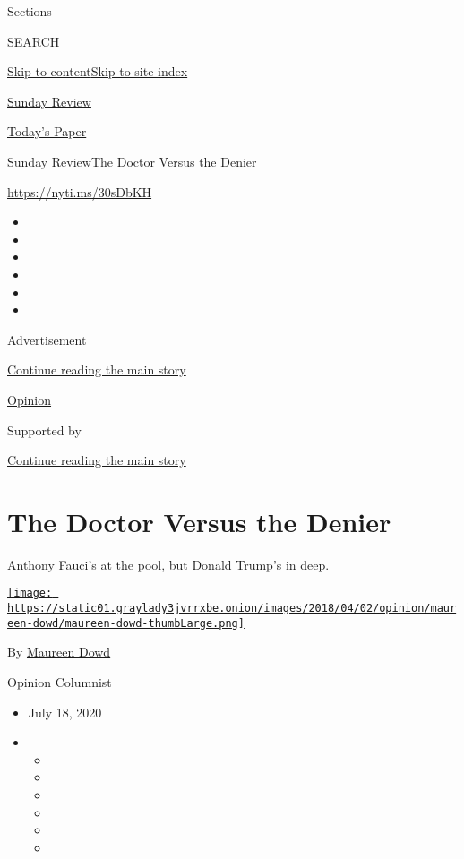 Sections

SEARCH

\protect\hyperlink{site-content}{Skip to
content}\protect\hyperlink{site-index}{Skip to site index}

\href{https://www.nytimes3xbfgragh.onion/section/opinion/sunday}{Sunday
Review}

\href{https://myaccount.nytimes3xbfgragh.onion/auth/login?response_type=cookie\&client_id=vi}{}

\href{https://www.nytimes3xbfgragh.onion/section/todayspaper}{Today's
Paper}

\href{/section/opinion/sunday}{Sunday Review}\textbar{}The Doctor Versus
the Denier

\url{https://nyti.ms/30sDbKH}

\begin{itemize}
\item
\item
\item
\item
\item
\item
\end{itemize}

Advertisement

\protect\hyperlink{after-top}{Continue reading the main story}

\href{/section/opinion}{Opinion}

Supported by

\protect\hyperlink{after-sponsor}{Continue reading the main story}

\hypertarget{the-doctor-versus-the-denier}{%
\section{The Doctor Versus the
Denier}\label{the-doctor-versus-the-denier}}

Anthony Fauci's at the pool, but Donald Trump's in deep.

\href{https://www.nytimes3xbfgragh.onion/by/maureen-dowd}{\texttt{[image: https://static01.graylady3jvrrxbe.onion/images/2018/04/02/opinion/maureen-dowd/maureen-dowd-thumbLarge.png]}}

By \href{https://www.nytimes3xbfgragh.onion/by/maureen-dowd}{Maureen
Dowd}

Opinion Columnist

\begin{itemize}
\item
  July 18, 2020
\item
  \begin{itemize}
  \item
  \item
  \item
  \item
  \item
  \item
  \end{itemize}
\end{itemize}


